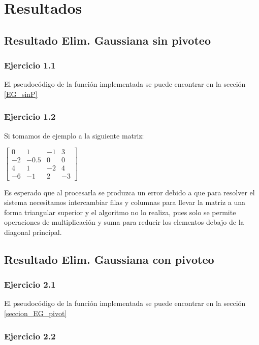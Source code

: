 \section{Resultados}
\label{resultados}

\subsection{Resultado Elim. Gaussiana sin pivoteo}
\label{resultados EG}

\subsubsection{Ejercicio 1.1}
El pseudocódigo de la función implementada se puede encontrar en la sección \ref{EG_sinP}

\subsubsection{Ejercicio 1.2}

Si tomamos de ejemplo a la siguiente matriz:

\begin{center}
$\begin{bmatrix}
0 & 1 & -1 & 3\\
-2 & -0.5 & 0 & 0\\
4 & 1 & -2 & 4\\
-6 & -1 & 2 & -3
\end{bmatrix}$
\end{center}
                  
Es esperado que al procesarla se produzca un error debido a que para resolver el sistema necesitamos intercambiar filas y columnas para llevar la matriz a una forma triangular superior y el algoritmo no lo realiza, pues solo se permite operaciones de multiplicación y suma para reducir los elementos debajo de la diagonal principal.

\subsection{Resultado Elim. Gaussiana con pivoteo}
\label{resultados EG c/p}
\subsubsection{Ejercicio 2.1}
El pseudocódigo de la función implementada se puede encontrar en la sección \ref{seccion_EG_pivot}

\subsubsection{Ejercicio 2.2}

